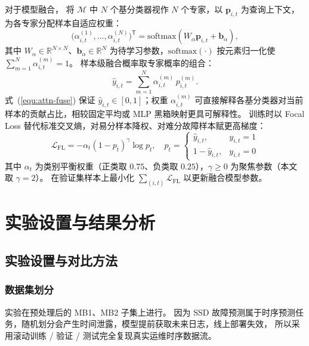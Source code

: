 对于模型融合，
将 $\mathcal{M}$ 中 $N$ 个基分类器视作 $N$ 个专家，以 $\mathbf{p}_{i,t}$ 为查询上下文，为各专家分配样本自适应权重：
\begin{equation}
\label{equ:attn-weight}
\bigl(\alpha_{i,t}^{(1)},\ldots,\alpha_{i,t}^{(N)}\bigr)^{\mathsf{T}}
=\mathrm{softmax}\!\left(W_{\alpha}\mathbf{p}_{i,t}+\mathbf{b}_{\alpha}\right),
\end{equation}
其中 $W_{\alpha}\in\mathbb{R}^{N\times N}$、$\mathbf{b}_{\alpha}\in\mathbb{R}^{N}$ 为待学习参数，$\mathrm{softmax}(\cdot)$ 按元素归一化使 $\sum_{m=1}^{N}\alpha_{i,t}^{(m)}=1$。
样本级融合概率取专家概率的组合：
\begin{equation}
\label{equ:attn-fuse}
\hat{y}_{i,t}=\sum_{m=1}^{N}\alpha_{i,t}^{(m)}\,p_{i,t}^{(m)}.
\end{equation}
式~(\ref{equ:attn-fuse}) 保证 $\hat{y}_{i,t}\in[0,1]$；权重 $\alpha_{i,t}^{(m)}$ 可直接解释各基分类器对当前样本的贡献占比，相较固定平均或 MLP 黑箱映射更具可解释性。
训练时以 Focal Loss 替代标准交叉熵，对易分样本降权、对难分故障样本赋更高梯度：
\begin{equation}
\label{equ:focal-loss}
\mathcal{L}_{\mathrm{FL}}=-\alpha_t(1-p_t)^{\gamma}\log p_t,\quad
p_t=
\left\{
\begin{array}{ll}
\hat{y}_{i,t}, & y_{i,t}=1 \\
1-\hat{y}_{i,t}, & y_{i,t}=0
\end{array}
\right.
\end{equation}
其中 $\alpha_t$ 为类别平衡权重（正类取 $0.75$、负类取 $0.25$），$\gamma\ge0$ 为聚焦参数（本文取 $\gamma=2$）。
在验证集样本上最小化 $\sum_{(i,t)}\mathcal{L}_{\mathrm{FL}}$ 以更新融合模型参数。

\clearpage
\section{实验设置与结果分析}

\subsection{实验设置与对比方法}
\label{sec:chap3-exp-split}

\subsubsection{数据集划分}

实验在预处理后的 MB1、MB2 子集上进行。
因为 SSD 故障预测属于时序预测任务，随机划分会产生时间泄露，模型提前获取未来日志，线上部署失效，
所以采用滚动训练 / 验证 / 测试完全复现真实运维时序数据流。

